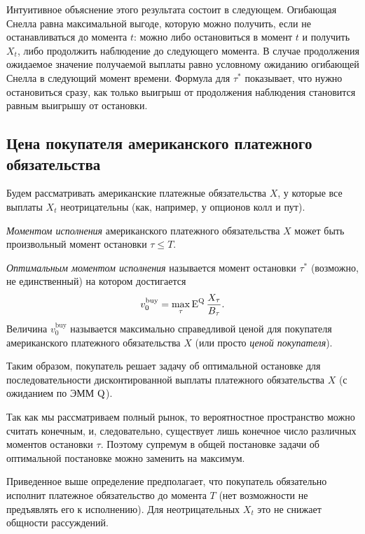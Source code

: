 Интуитивное объяснение этого результата состоит в следующем. 
Огибающая Снелла равна максимальной выгоде, которую можно получить, если не останавливаться до момента $t$: можно либо остановиться в момент $t$ и получить $X_t$, либо продолжить наблюдение до следующего момента.
В случае продолжения ожидаемое значение получаемой выплаты равно условному ожиданию огибающей Снелла в следующий момент времени.
Формула для $\tau^*$ показывает, что нужно остановиться сразу, как только выигрыш от продолжения наблюдения становится равным выигрышу от остановки.


\subsection{Цена покупателя американского платежного обязательства}

Будем рассматривать американские платежные обязательства $X$, у которые все выплаты $X_t$ неотрицательны (как, например, у опционов колл и пут).
\begin{definition}
\emph{Моментом исполнения} американского платежного обязательства $X$ может быть произвольный момент остановки $\tau \le T$. 

\emph{Оптимальным моментом исполнения} называется момент остановки $\tau^*$ (возможно, не единственный) на котором достигается 
\[
v_0^\text{buy} = \max_\tau \operatorname{E}^{\mathrm{Q}} \frac{X_\tau}{B_\tau}.
\]
Величина $v_0^\text{buy}$ называется максимально справедливой ценой для покупателя американского платежного обязательства $X$ (или просто \emph{ценой покупателя}).
\end{definition}

Таким образом, покупатель решает задачу об оптимальной остановке для последовательности дисконтированной выплаты платежного обязательства $X$ (с ожиданием по ЭММ $\mathrm{Q}$).

\begin{remark}
Так как мы рассматриваем полный рынок, то вероятностное пространство можно считать конечным, и, следовательно, существует лишь конечное число различных моментов остановки $\tau$.
Поэтому супремум в общей постановке задачи об оптимальной постановке можно заменить на максимум.
\end{remark}

\begin{remark}
Приведенное выше определение предполагает, что покупатель обязательно исполнит платежное обязательство до момента $T$ (нет возможности не предъявлять его к исполнению).
Для неотрицательных $X_t$ это не снижает общности рассуждений.
\end{remark}

